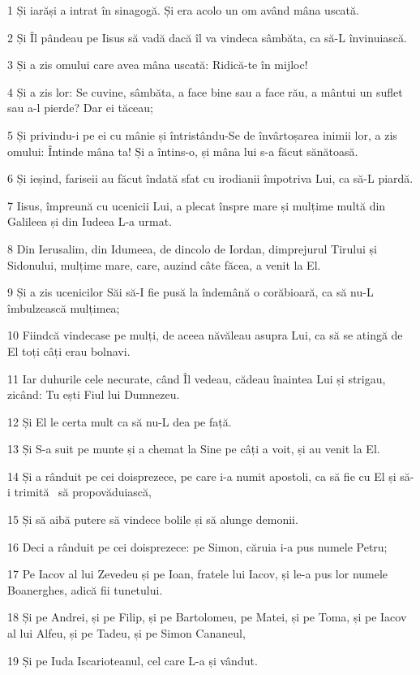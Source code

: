 \par 1 Și iarăși a intrat în sinagogă. Și era acolo un om având mâna uscată.
\par 2 Și Îl pândeau pe Iisus să vadă dacă îl va vindeca sâmbăta, ca să-L învinuiască.
\par 3 Și a zis omului care avea mâna uscată: Ridică-te în mijloc!
\par 4 Și a zis lor: Se cuvine, sâmbăta, a face bine sau a face rău, a mântui un suflet sau a-l pierde? Dar ei tăceau;
\par 5 Și privindu-i pe ei cu mânie și întristându-Se de învârtoșarea inimii lor, a zis omului: Întinde mâna ta! Și a întins-o, și mâna lui s-a făcut sănătoasă.
\par 6 Și ieșind, fariseii au făcut îndată sfat cu irodianii împotriva Lui, ca să-L piardă.
\par 7 Iisus, împreună cu ucenicii Lui, a plecat înspre mare și mulțime multă din Galileea și din Iudeea L-a urmat.
\par 8 Din Ierusalim, din Idumeea, de dincolo de Iordan, dimprejurul Tirului și Sidonului, mulțime mare, care, auzind câte făcea, a venit la El.
\par 9 Și a zis ucenicilor Săi să-I fie pusă la îndemână o corăbioară, ca să nu-L îmbulzească mulțimea;
\par 10 Fiindcă vindecase pe mulți, de aceea năvăleau asupra Lui, ca să se atingă de El toți câți erau bolnavi.
\par 11 Iar duhurile cele necurate, când Îl vedeau, cădeau înaintea Lui și strigau, zicând: Tu ești Fiul lui Dumnezeu.
\par 12 Și El le certa mult ca să nu-L dea pe față.
\par 13 Și S-a suit pe munte și a chemat la Sine pe câți a voit, și au venit la El.
\par 14 Și a rânduit pe cei doisprezece, pe care i-a numit apostoli, ca să fie cu El și să-i trimită  să propovăduiască,
\par 15 Și să aibă putere să vindece bolile și să alunge demonii.
\par 16 Deci a rânduit pe cei doisprezece: pe Simon, căruia i-a pus numele Petru;
\par 17 Pe Iacov al lui Zevedeu și pe Ioan, fratele lui Iacov, și le-a pus lor numele Boanerghes, adică fii tunetului.
\par 18 Și pe Andrei, și pe Filip, și pe Bartolomeu, pe Matei, și pe Toma, și pe Iacov al lui Alfeu, și pe Tadeu, și pe Simon Cananeul,
\par 19 Și pe Iuda Iscarioteanul, cel care L-a și vândut.
